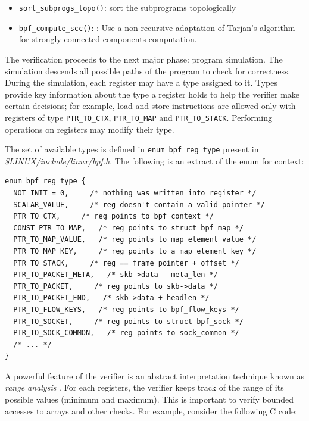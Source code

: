 \begin{itemize}
    \item \verb|sort_subprogs_topo()|: sort the subprograms topologically

    \item \verb|bpf_compute_scc()|: : Use a non-recursive adaptation of Tarjan's
      algorithm for strongly connected components computation.





\end{itemize}


The verification proceeds to the next major phase: program simulation. The
simulation descends all possible paths of the program to check for correctness.
During the simulation, each register may have a type assigned to it. Types
provide key information about the type a register holds to help the verifier
make certain decisions; for example, load and store instructions are allowed
only with registers of type \verb|PTR_TO_CTX|, \verb|PTR_TO_MAP| and
\verb|PTR_TO_STACK|. Performing operations on registers may modify their type.

The set of available types is defined in \verb|enum bpf_reg_type| present in
\textit{\$LINUX/include/linux/bpf.h}. The following is an extract of the enum
for context:

\begin{verbatim}
enum bpf_reg_type {
  NOT_INIT = 0,     /* nothing was written into register */
  SCALAR_VALUE,     /* reg doesn't contain a valid pointer */
  PTR_TO_CTX,     /* reg points to bpf_context */
  CONST_PTR_TO_MAP,   /* reg points to struct bpf_map */
  PTR_TO_MAP_VALUE,   /* reg points to map element value */
  PTR_TO_MAP_KEY,     /* reg points to a map element key */
  PTR_TO_STACK,     /* reg == frame_pointer + offset */
  PTR_TO_PACKET_META,   /* skb->data - meta_len */
  PTR_TO_PACKET,     /* reg points to skb->data */
  PTR_TO_PACKET_END,   /* skb->data + headlen */
  PTR_TO_FLOW_KEYS,   /* reg points to bpf_flow_keys */
  PTR_TO_SOCKET,     /* reg points to struct bpf_sock */
  PTR_TO_SOCK_COMMON,   /* reg points to sock_common */
  /* ... */
}
\end{verbatim}


A powerful feature of the verifier is an abstract interpretation technique known
as \textit{range analysis} \cite{cousot1977abstract}. For each registers, the
verifier keeps track of the range of its possible values (minimum and maximum).
This is important to verify bounded accesses to arrays and other checks. For
example, consider the following C code:

